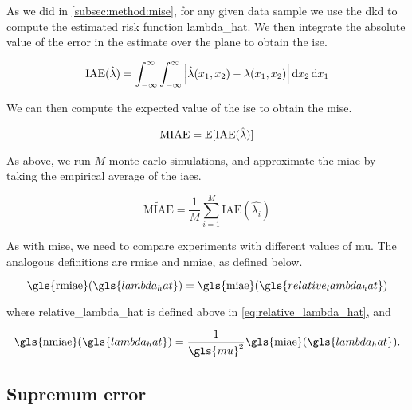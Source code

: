 As we did in \autoref{subsec:method:mise}, for any given data sample we use the \gls{dkd} to compute the estimated risk function \gls{lambda_hat}.
We then integrate the absolute value of the error in the estimate over the plane to obtain the \gls{ise}.

\begin{equation}
    \mbox{IAE}(\hat{\lambda}) = 
        \int_{-\infty}^{\infty} \int_{-\infty}^{\infty}
            \left|
                \hat{\lambda}(x_1, x_2) - \lambda(x_1, x_2)
            \right| \mathop{}\!\mathrm{d}{x_2} \mathop{}\!\mathrm{d}{x_1}
\end{equation}

We can then compute the expected value of the \gls{ise} to obtain the \gls{mise}.

\begin{equation}
    \mbox{MIAE} = \mathbb{E} [\mbox{IAE}(\hat{\lambda})]
\end{equation}

As above, we run \(M\) monte carlo simulations,
and approximate the \gls{miae} by taking the empirical average of the \glspl{iae}.

\begin{equation}
    \widetilde{\mbox{MIAE}} = \frac{1}{M} \sum_{i=1}^{M} \mbox{IAE}(\hat{\lambda_i})
\end{equation}

As with \gls{mise}, we need to compare experiments with different values of \gls{mu}.
The analogous definitions are \gls{rmiae} and \gls{nmiae}, as defined below.

\begin{equation}
\label{eq:rmiae}
    \mbox{\gls{rmiae}}(\gls{lambda_hat}) = 
        \mbox{\gls{miae}}(\gls{relative_lambda_hat}) \\
\end{equation}

where \gls{relative_lambda_hat} is defined above in \cref{eq:relative_lambda_hat},
and

\begin{equation}
\label{eq:nmiae}
    \mbox{\gls{nmiae}}(\gls{lambda_hat}) = 
        \frac{1}{\gls{mu}^2} \mbox{\gls{miae}}(\gls{lambda_hat}) \text{.}
\end{equation}


\subsection{Supremum error}
\label{subsec:method:sup_error}

